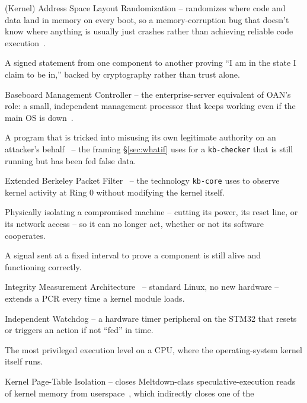 \documentclass[11pt,a4paper]{article}
\begin{document}
\begin{description}[leftmargin=3.2cm, style=nextline, itemsep=0.35em]
  \item[ASLR/KASLR] (Kernel) Address Space Layout Randomization --
    randomizes where code and data land in memory on every boot, so a
    memory-corruption bug that doesn't know where anything is usually
    just crashes rather than achieving reliable code
    execution~\cite{pax2003}.
  \item[Attestation] A signed statement from one component to another
    proving ``I am in the state I claim to be in,'' backed by
    cryptography rather than trust alone.
  \item[BMC] Baseboard Management Controller -- the enterprise-server
    equivalent of OAN's role: a small, independent management processor
    that keeps working even if the main OS is down~\cite{dmtfipmi}.
  \item[Confused Deputy] A program that is tricked into misusing its
    own legitimate authority on an attacker's behalf~\cite{hardy1988}
    -- the framing \S\ref{sec:whatif} uses for a \texttt{kb-checker}
    that is still running but has been fed false data.
  \item[eBPF] Extended Berkeley Packet Filter~\cite{mccanne1993,kernelebpf} -- the technology
    \texttt{kb-core} uses to observe kernel activity at Ring 0 without
    modifying the kernel itself.
  \item[Fencing] Physically isolating a compromised machine -- cutting
    its power, its reset line, or its network access -- so it can no
    longer act, whether or not its software cooperates.
  \item[Heartbeat] A signal sent at a fixed interval to prove a
    component is still alive and functioning correctly.
  \item[IMA] Integrity Measurement Architecture~\cite{sailer2004,kernelima}
    -- standard Linux, no new hardware -- extends a PCR every time a
    kernel module loads.
  \item[IWDG] Independent Watchdog -- a hardware timer peripheral on the
    STM32 that resets or triggers an action if not ``fed'' in time.
  \item[Kernel Ring 0] The most privileged execution level on a CPU,
    where the operating-system kernel itself runs.
  \item[KPTI] Kernel Page-Table Isolation -- closes Meltdown-class
    speculative-execution reads of kernel memory from
    userspace~\cite{lipp2018}, which indirectly closes one of the

\end{description}
\end{document}
